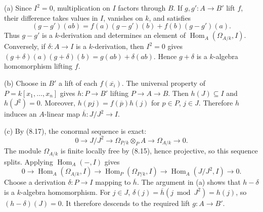 (a) Since $I^2=0$, multiplication on $I$ factors through $B$. If $g,g':A\to B'$ lift $f$, their difference takes values in $I$, vanishes on $k$, and satisfies
\[(g-g')(ab)=f(a)(g-g')(b)+f(b)(g-g')(a).\]
Thus $g-g'$ is a $k$-derivation and determines an element of $\operatorname{Hom}_A(\Omega_{A/k},I)$. Conversely, if $\delta:A\to I$ is a $k$-derivation, then $I^2=0$ gives $(g+\delta)(a)(g+\delta)(b)=g(ab)+\delta(ab)$. Hence $g+\delta$ is a $k$-algebra homomorphism lifting $f$.

(b) Choose in $B'$ a lift of each $f(\overline{x_i})$. The universal property of $P=k[x_1,\ldots,x_n]$ gives $h:P\to B'$ lifting $P\to A\to B$. Then $h(J)\subseteq I$ and $h(J^2)=0$. Moreover, $h(pj)=f(\overline p)h(j)$ for $p\in P$, $j\in J$. Therefore $h$ induces an $A$-linear map $\overline h:J/J^2\to I$.

(c) By (8.17), the conormal sequence is exact:
\[0\to J/J^2\to\Omega_{P/k}\otimes_P A\to\Omega_{A/k}\to0.\]
The module $\Omega_{A/k}$ is finite locally free by (8.15), hence projective, so this sequence splits. Applying $\operatorname{Hom}_A(-,I)$ gives
\[0\to\operatorname{Hom}_A(\Omega_{A/k},I)\to\operatorname{Hom}_P(\Omega_{P/k},I)\to\operatorname{Hom}_A(J/J^2,I)\to0.\]
Choose a derivation $\delta:P\to I$ mapping to $\overline h$. The argument in (a) shows that $h-\delta$ is a $k$-algebra homomorphism. For $j\in J$, $\delta(j)=\overline h(j\bmod J^2)=h(j)$, so $(h-\delta)(J)=0$. It therefore descends to the required lift $g:A\to B'$.
